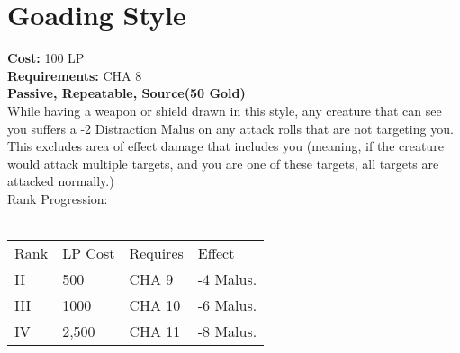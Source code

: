 \section{Goading Style}\label{perk:goadingStyle}
\textbf{Cost:} 100 LP\\
\textbf{Requirements:} CHA 8\\
\textbf{Passive, Repeatable, Source(50 Gold)}\\
While having a weapon or shield drawn in this style, any creature that can see you suffers a -2 Distraction Malus on any attack rolls that are not targeting you.
This excludes area of effect damage that includes you (meaning, if the creature would attack multiple targets, and you are one of these targets, all targets are attacked normally.)\\

Rank Progression:\\
\\
\begin{tabular}{l | l | l | l}
    Rank & LP Cost & Requires & Effect\\
    II & 500 & CHA 9 & -4 Malus.\\
    III & 1000 & CHA 10 & -6 Malus.\\
    IV & 2,500 & CHA 11 & -8 Malus.\\
\end{tabular}